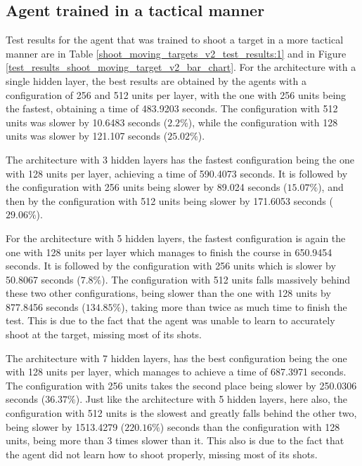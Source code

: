 \subsection{Agent trained in a tactical manner} \label{shoot_moving_target_tactical_subsection}

Test results for the agent that was trained to shoot a target in a more tactical manner are in Table \ref{shoot_moving_targets_v2_test_results:1} and in Figure \ref{test_results_shoot_moving_target_v2_bar_chart}. For the architecture with a single hidden layer, the best results are obtained by the agents with a  configuration of 256 and 512 units per layer, with the one with 256 units being the fastest, obtaining a time of 483.9203 seconds. The configuration with 512 units was slower by 10.6483 seconds ($2.2\%$), while the configuration with 128 units was slower by 121.107 seconds ($25.02\%$).

The architecture with 3 hidden layers has the fastest configuration being the one with 128 units per layer, achieving a time of 590.4073 seconds. It is followed by the configuration with 256 units being slower by 89.024 seconds ($15.07\%$), and then by the configuration with 512 units being slower by 171.6053 seconds ($29.06\%$).

For the architecture with 5 hidden layers, the fastest configuration is again the one with 128 units per layer which manages to finish the course in 650.9454 seconds. It is followed by the configuration with 256 units which is slower by 50.8067 seconds ($7.8\%$). The configuration with 512 units falls massively behind these two other configurations, being slower than the one with 128 units by 877.8456 seconds ($134.85\%$), taking more than twice as much time to finish the test. This is due to the fact that the agent was unable to learn to accurately shoot at the target, missing most of its shots.

The architecture with 7 hidden layers, has the best configuration being the one with 128 units per layer, which manages to achieve a time of 687.3971 seconds. The configuration with 256 units takes the second place being slower by 250.0306 seconds ($36.37\%$). Just like the architecture with 5 hidden layers, here also, the configuration with 512 units is the slowest and greatly falls behind the other two, being slower by 1513.4279 ($220.16\%$) seconds than the configuration with 128 units, being more than 3 times slower than it. This also is due to the fact that the agent did not learn how to shoot properly, missing most of its shots.

